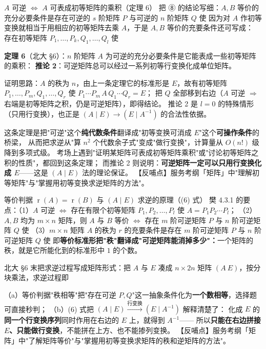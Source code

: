 \begin{fdeep}{$A$ 可逆 $\iff$ $A$ 可表成初等矩阵的乘积（定理 6）}
把 ⑧ 的结论写细：$A,B$ 等价的充分必要条件是存在可逆的 $s$ 阶矩阵 $P$ 与可逆的 $n$ 阶矩阵 $Q$ 使
因为对 $A$ 作初等变换就相当于用相应的初等矩阵去乘 $A$，于是 $A,B$ 等价的充要条件还可写成：
存在初等矩阵 $P_1,\dots,P_k,Q_1,\dots,Q_l$ 使

\textbf{定理 6}（北大 §6）：$n$ 阶矩阵 $A$ 为可逆的充分必要条件是它能表成一些初等矩阵的乘积：
\textbf{推论 2}：可逆矩阵总可以经过一系列初等行变换化成单位矩阵。

证明思路：$A$ 的秩为 $n$，由上一条定理它的标准形是 $E$，故有初等矩阵
$P_1,\dots,P_m,Q_1,\dots,Q_r$ 使 $P_1\cdots P_m\,A\,Q_1\cdots Q_r=E$；
把 $Q$ 全部移到右边（$A$ 可逆 $\Rightarrow$ 右端是初等矩阵之积，仍是可逆矩阵），即得结论。
推论 2 是 $l=0$ 的特殊情形（只用行变换），也正是 $(A\mid E)\to(E\mid A^{-1})$ 的合法性依据。

这条定理是把"可逆"这个\textbf{纯代数条件}翻译成"初等变换可消成 $E$"这个\textbf{可操作条件}的桥梁，
从而把求逆从"算 $n^2$ 个代数余子式"变成"做行变换"，计算量从 $O(n!)$ 级降到多项式级。
考场上遇到"证明某矩阵可表成初等矩阵乘积"或"讨论初等矩阵之积的性质"，都回到这条定理；
而推论 2 则说明：\textbf{可逆矩阵一定可以只用行变换化成 $E$}——这是 $(A\mid E)$ 法的理论保证。
【反哺点】服务考纲「矩阵」中"理解初等矩阵"与"掌握用初等变换求逆矩阵的方法"。
\end{fdeep}

\begin{fdeep}{等价判据 $\operatorname{r}(A)=\operatorname{r}(B)$ 与 $(A\mid E)$ 求逆的原理（(6) 式）}
樊 4.3.1 的要点：（1）$A$ 可逆 $\iff$ 存在有限个初等矩阵 $P_1,P_2,\dots,P_l$ 使 $A=P_1P_2\cdots P_l$；
（2）$A,B$ 均为 $m\times n$ 矩阵，则 $A$ 与 $B$ 等价 $\iff$ 存在 $m$ 阶可逆矩阵 $P$ 与 $n$ 阶可逆矩阵 $Q$ 使
（3）$m\times n$ 矩阵 $A$ 的秩为 $r$ 的充要条件是存在 $m$ 阶可逆矩阵 $P$ 与 $n$ 阶可逆矩阵 $Q$ 使
即\textbf{等价标准形把"秩"翻译成"可逆矩阵能消掉多少"：}一个矩阵的秩，就是它所能化到的标准形中 $1$ 的个数。

北大 §6 末把求逆过程写成矩阵形式：把 $A$ 与 $E$ 凑成 $n\times2n$ 矩阵 $(A\ E)$，按分块乘法，求逆过程即

（a）等价判据"秩相等"把"存在可逆 $P,Q$"这一抽象条件化为\textbf{一个数相等}，选择题可直接秒判；
（b）(6) 式把 $(A\mid E)\xrightarrow{\text{行变换}}(E\mid A^{-1})$ 解释清楚了：
化成 $E$ 的\textbf{同一个行变换序列}同时作用在右边的 $E$ 上，就得到 $A^{-1}$——
所以\textbf{只能在右边拼接 $E$、只能做行变换}，不能拼在上方、也不能掺列变换。
【反哺点】服务考纲「矩阵」中"了解矩阵等价"与"掌握用初等变换求矩阵的秩和逆矩阵的方法"。
\end{fdeep}


